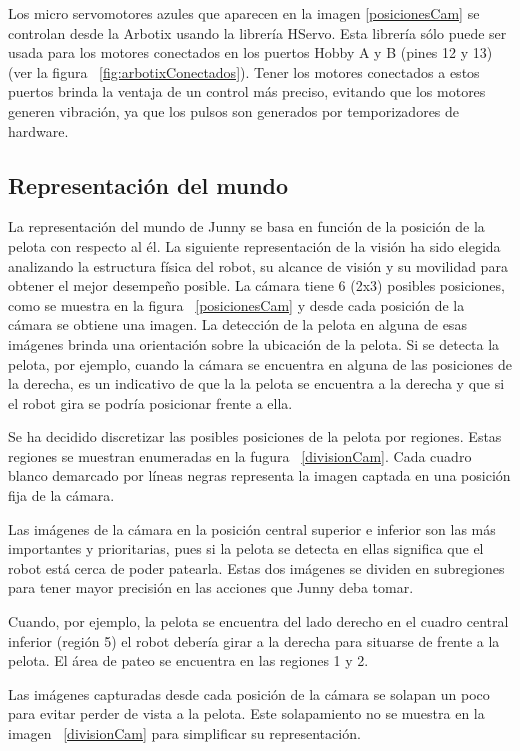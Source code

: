 Los micro servomotores azules que aparecen en la imagen \ref{posicionesCam} se controlan desde la Arbotix usando la librería HServo. Esta librería s\'olo puede ser usada para los motores conectados en los puertos Hobby A y B (pines 12 y 13) (ver la figura ~\ref{fig:arbotixConectados}). Tener los motores conectados a estos puertos brinda la ventaja de un control más preciso, evitando que los motores generen vibración, ya que los pulsos son generados por temporizadores de hardware. 

\subsection{Representaci\'on del mundo}\label{mundo}

La representación del mundo de Junny se basa en función de la posición de la pelota con respecto al él. 
La siguiente representaci\'on de la visi\'on ha sido elegida analizando la estructura f\'isica del robot, su alcance de visi\'on y su movilidad para obtener el mejor desempeño posible.
La cámara tiene 6 (2x3) posibles posiciones, como se muestra en la figura ~\ref{posicionesCam} y desde cada posición de la cámara se obtiene una imagen. La detección de la pelota en alguna de esas im\'agenes brinda una orientación sobre la ubicación de la pelota. Si se detecta la pelota, por ejemplo, cuando la cámara se encuentra en alguna de las posiciones de la derecha, es un indicativo de que la la pelota se encuentra a la derecha y que si el robot gira se podría posicionar frente a ella. 

Se ha decidido discretizar las posibles posiciones de la pelota por regiones. Estas regiones se muestran enumeradas en la fugura ~\ref{divisionCam}. Cada cuadro blanco demarcado por líneas negras representa la imagen captada en una posición fija de la cámara. 

Las im\'agenes de la cámara en la posición central superior e inferior son las más importantes y prioritarias, pues si la pelota se detecta en ellas significa que el robot está cerca de poder patearla. Estas dos im\'agenes se dividen en subregiones para tener mayor precisión en las acciones que Junny deba tomar.

Cuando, por ejemplo, la pelota se encuentra del lado derecho en el cuadro central inferior (región 5) el robot debería girar a la derecha para situarse de frente a la pelota. El área de pateo se encuentra en las regiones 1 y 2.

Las imágenes capturadas desde cada posición de la cámara se solapan un poco para evitar perder de vista a la pelota. Este solapamiento no se muestra en la imagen ~\ref{divisionCam} para simplificar su representación.


